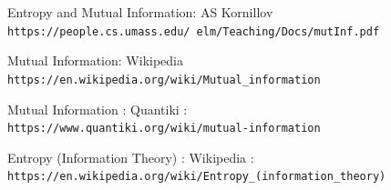 \documentclass{article}
\begin{document}
\newpage

\begin{thebibliography}{9}
\label{sec:hello}

Entropy and Mutual Information: \newline
AS Kornillov
\\\texttt{https://people.cs.umass.edu/~elm/Teaching/Docs/mutInf.pdf}

Mutual Information: \newline
Wikipedia 
\\
\texttt{https://en.wikipedia.org/wiki/Mutual_information}

Mutual Information : \newline
Quantiki :
\\
\texttt{https://www.quantiki.org/wiki/mutual-information}

Entropy (Information Theory) : \newline
Wikipedia :
\\
\texttt{https://en.wikipedia.org/wiki/Entropy_(information_theory)}

\end{thebibliography}
\end{document}
